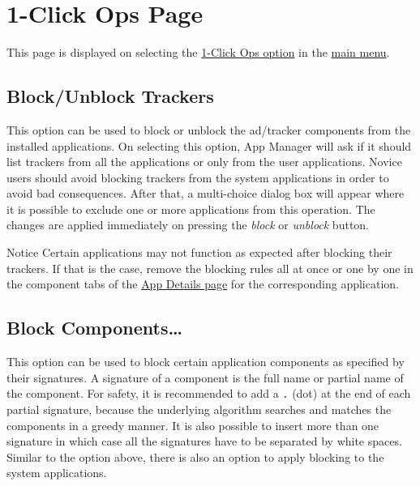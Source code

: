 \section{1-Click Ops Page}\label{sec:1-click-ops-page} %
This page is displayed on selecting the \hyperref[subsubsec:main:1-click-ops]{1-Click Ops option} in the \hyperref[subsec:main-page-options-menu]{main menu}.

\subsection{Block/Unblock Trackers}\label{subsec:block-unblock-trackers} %
This option can be used to block or unblock the ad/tracker components from the installed applications.
On selecting this option, App Manager will ask if it should list trackers from all the applications or only from the user applications.
Novice users should avoid blocking trackers from the system applications in order to avoid bad consequences.
After that, a multi-choice dialog box will appear where it is possible to exclude one or more applications from this operation.
The changes are applied immediately on pressing the \textit{block} or \textit{unblock} button.

\begin{warning}{Notice}
    Certain applications may not function as expected after blocking their trackers.
    If that is the case, remove the blocking rules all at once or one by one in the component tabs of the \hyperref[sec:app-details-page]{App Details page} for the corresponding application.
\end{warning}


\subsection{Block Components\dots}\label{subsec:block-components-dots} %
This option can be used to block certain application components as specified by their signatures.
A signature of a component is the full name or partial name of the component.
For safety, it is recommended to add a \texttt{.} (dot) at the end of each partial signature, because the underlying
algorithm searches and matches the components in a greedy manner.
It is also possible to insert more than one signature in which case all the signatures have to be separated by white spaces.
Similar to the option above, there is also an option to apply blocking to the system applications.


